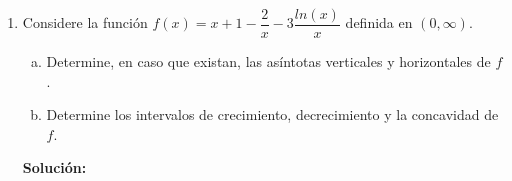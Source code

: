 \documentclass[12pt]{article}
\newenvironment{solucion}
{\begin{mdframed}[backgroundcolor=black!10]
		{\bf Solución:}\\
	}
	{
	\end{mdframed}
}
\newenvironment{preguntas}
{\begin{enumerate}\itemsep12pt
	}
	{
	\end{enumerate}
}
\newcommand{\ra}{\rightarrow}
\begin{document}
\begin{preguntas}
\begin{solucion}
\begin{enumerate}[a)]
Es decir, debemos resolver
$$\lim\limits_{x\ra 0}\frac{ln(x)}{\ln (e^x-1)}$$
Notemos que al evaluar, obtenemos $\dfrac{\infty}{\infty}$, por lo que podemos aplicar L'Hopital, esto es
$$\lim\limits_{x\ra 0}\frac{ln(x)}{\ln (e^x-1)} \stackrel{L'H}{=}
\lim\limits_{x\ra 0}\frac{\dfrac{1}{x}}{\dfrac{e^x}{e^x-1}} =
\lim\limits_{x\ra 0}\frac{e^x-1}{xe^x}  \stackrel{L'H}{=} 
\lim\limits_{x\ra 0}\frac{e^x}{e^x + xe^x} = 1$$
No olvidemos que esto corresponde al exponente del límite pedido, por lo que 
$$\lim\limits_{x\ra 0} x^{\frac{1}{\ln (e^x-1)}} = e^1 = e$$
\item $\lim\limits_{x\ra \infty} \left(1+\dfrac{a}{x}\right)^{bx}$\\
\\
De forma similar, al ejercicio anterior, tenemos que
$$\lim\limits_{x\ra \infty} \left(1+\dfrac{a}{x}\right)^{bx} =
\lim\limits_{x\ra \infty} e^{\ln\left(\left(1+\frac{a}{x}\right)^{bx}\right)} =
\lim\limits_{x\ra \infty} e^{bx\ln\left(1+\frac{a}{x}\right)} =
e^{\lim\limits_{x\ra \infty} bx\ln\left(1+\frac{a}{x}\right)}$$
Luego, debemos resolver
$$\lim\limits_{x\ra \infty} bx\ln\left(1+\dfrac{a}{x}\right)$$
Notemos que este límite es de la forma $\infty \cdot 0$.\\

Reordenando,
$$\lim\limits_{x\ra \infty} bx\ln\left(1+\dfrac{a}{x}\right) =
\lim\limits_{x\ra \infty} \dfrac{\ln\left(1+\dfrac{a}{x}\right)}{\dfrac{1}{bx}} = \dfrac{0}{0} $$
Luego,
{\scriptsize$$\stackrel{L'H}{=} \lim\limits_{x\ra \infty}  \dfrac{\dfrac{-\frac{a}{x^2}}{1+\frac{a}{x}}}{-\dfrac{b}{(bx)^2}} =
\lim\limits_{x\ra \infty} \dfrac{\dfrac{\frac{a}{x^2}}{\frac{a+x}{x}}}{\dfrac{1}{bx^2}} =
\lim\limits_{x\ra \infty} \dfrac{\dfrac{ax}{x^2(a+x)}}{\dfrac{1}{bx^2}} =
\lim\limits_{x\ra \infty} \dfrac{abx^3}{x^2(a+x)} =
\lim\limits_{x\ra \infty} \dfrac{abx}{a+x} \stackrel{L'H}{=} 
\lim\limits_{x\ra \infty} ab = ab$$}\\
Finalmente,
$$\lim\limits_{x\ra \infty} \left(1+\dfrac{a}{x}\right)^{bx} = e^{ab}$$
\end{enumerate}
\end{solucion}
\item Considere la función $f(x) = x + 1 - \dfrac{2}{x} - 3\dfrac{ln(x)}{x}$ definida en $(0, \infty)$.
\begin{enumerate}[a)]
\item Determine, en caso que existan, las asíntotas verticales y horizontales de $f$.
\item Determine los intervalos de crecimiento, decrecimiento y la concavidad de $f$.
\end{enumerate}
\begin{solucion}


\end{solucion}
\end{preguntas}
\end{document}
